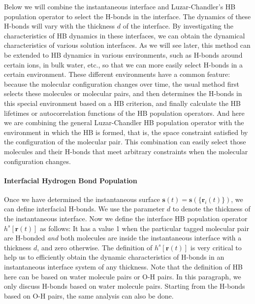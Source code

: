 {Below we will combine the instantaneous interface and Luzar-Chandler's HB population operator \cite{AL96} to select the H-bonds 
in the interface. The dynamics of these H-bonds will vary with the thickness $d$ of the interface. By investigating the characteristics of HB dynamics
in these interfaces, we can obtain the dynamical characteristics of various solution interfaces. As we will see later, this method can be extended to HB dynamics 
in various environments, such as H-bonds around certain ions, in bulk water, etc., so that we can more easily select H-bonds in a certain environment. 
These different environments have a common feature: because the molecular configuration changes over time, the usual method first selects these molecules or molecular pairs, 
and then determines the H-bonds in this special environment based on a HB criterion, and finally calculate the HB lifetimes or autocorrelation functions of 
the HB population operators. %
And here we are combining the general Luzar-Chandler HB population operator with the environment in which the HB is formed,
 that is, the space constraint satisfied by the configuration of the molecular pair. This combination can easily select those molecules and their H-bonds that meet arbitrary 
constraints when the molecular configuration changes.

\FloatBarrier
\paragraph{Interfacial Hydrogen Bond Population} \label{IHBP}
Once we have determined the instantaneous surface ${\mathbf s}(t)={\mathbf s}(\{{\mathbf r}_i(t)\})$, we can define interfacial H-bonds.
We use the parameter $d$ to denote the thickness of the instantaneous interface.
Now we define the interface HB population operator $h^{s}[{\mathbf r}(t)]$ as follows:
It has a value 1 when the particular tagged molecular pair are H-bonded \emph{and} both molecules are inside the instantaneous interface 
with a thickness $d$, and zero otherwise. 
The definition of  $h^{s}[{\mathbf r}(t)]$ is very critical to help us to efficiently obtain the dynamic characteristics of H-bonds in an
instantaneous interface system of any thickness. Note that the definition of HB here can be based on water molecule pairs or O-H pairs. 
In this paragraph, we only discuss H-bonds based on water molecule pairs. Starting from the H-bonds based on O-H pairs, the same analysis 
can also be done. 

}
